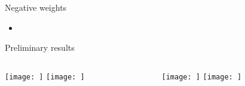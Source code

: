 \begin{frame}{Negative weights}
    \begin{itemize}
        \item 
    \end{itemize}
\end{frame}

\begin{frame}{Preliminary results}
    \begin{columns}
        \begin{column}{0.5\textwidth}
            \texttt{[image: ]}
            \texttt{[image: ]}
        \end{column}
        \begin{column}{0.5\textwidth}
            \texttt{[image: ]}
            \texttt{[image: ]}
        \end{column}
    \end{columns}
\end{frame}